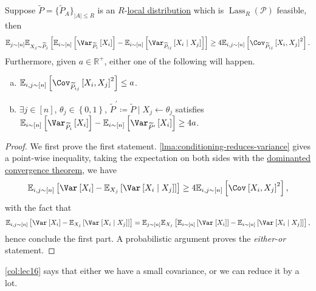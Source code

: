 \begin{corollary}\label{col:lec16}
	Suppose \(\widetilde{P} =\{ \widetilde{P} _A \}_{\left\vert A \right\vert \leq R} \) is an \(R\)-\hyperref[def:local-distribution]{local distribution} which is \(\mathop{\mathrm{Lass}}_R(\mathcal{P})\) feasible, then
	\[
		\mathbb{E}_{j\sim [n]} \mathbb{E}_{X_j\sim \widetilde{P} _j}\left[ \mathbb{E}_{i\sim [n]}\left[\Var_{\widetilde{P} _i}\left[X_i \right]\right] - \mathbb{E}_{i\sim [n]}\left[\Var_{\widetilde{P} _{ij}}\left[X_i \mid X_j \right]\right] \right] \geq 4 \mathbb{E}_{i, j\sim [n]}\left[\Cov_{\widetilde{P} _{ij}}\left[ X_i, X_j\right]^{2} \right].
	\]
	Furthermore, given \(a\in \mathbb{R} ^+\), either one of the following will happen.
	\begin{enumerate}[(a)]
		\item \(\mathbb{E}_{i, j\sim [n]}\left[\Cov_{\widetilde{P} _{ij}}\left[ X_i, X_j\right]^{2} \right] \leq a\).
		\item \(\exists j\in [n]\), \(\theta _j\in \left\{ 0, 1 \right\} \), \(\widetilde{P} ^\prime \coloneqq \widetilde{P} \mid X_j \gets \theta _j\) satisfies \(\mathbb{E}_{i\sim [n]}\left[\Var_{\widetilde{P} _i}\left[X_i \right]\right] - \mathbb{E}_{i\sim [n]}\left[\Var_{\widetilde{P}^\prime }\left[X_i \right]\right] \geq 4a\).
	\end{enumerate}
\end{corollary}
\begin{proof}
	We first prove the first statement. \autoref{lma:conditioning-reduces-variance} gives a point-wise inequality, taking the expectation on both sides with the \href{https://en.wikipedia.org/wiki/Dominated_convergence_theorem}{dominanted convergence theorem}, we have
	\[
		\mathbb{E}_{i, j\sim [n]}\left[\Var_{}\left[X_i \right] - \mathbb{E}_{X_j}\left[\Var_{}\left[X_i \mid X_j \right] \right] \right] \geq 4 \mathbb{E}_{i, j\sim [n]}\left[\Cov_{}\left[X_i, X_j \right] ^{2} \right],
	\]
	with the fact that
	\[
		\mathbb{E}_{i, j\sim [n]}\left[\Var_{}\left[X_i \right] - \mathbb{E}_{X_j}\left[\Var_{}\left[X_i \mid X_j \right] \right] \right] = \mathbb{E}_{j\sim [n]}\mathbb{E}_{X_j}\left[\mathbb{E}_{i\sim [n]}\left[\Var_{}\left[X_i \right] \right] - \mathbb{E}_{i\sim [n]}\left[\Var_{}\left[X_i\mid X_j \right] \right] \right],
	\]
	hence conclude the first part. A probabilistic argument proves the \emph{either-or} statement.
\end{proof}

\begin{remark}
	\autoref{col:lec16} says that either we have a small covariance, or we can reduce it by a lot.
\end{remark}

